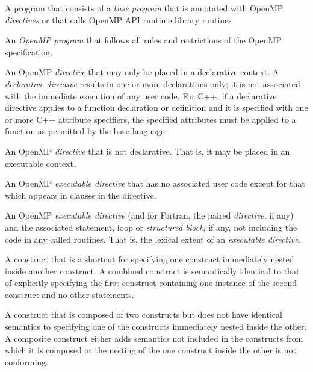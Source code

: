 \glossarydefstart
A program that consists of a \emph{base program} that is annotated with OpenMP
\emph{directives} or that calls OpenMP API runtime library routines
\glossarydefend

\glossarydefstart
An \emph{OpenMP program} that follows all rules and restrictions of the OpenMP
specification.
\glossarydefend

\glossarydefstart
An OpenMP \emph{directive} that may only be placed in a declarative context. A
\emph{declarative directive} results in one or more declarations only; it is 
not associated with the immediate execution of any user code.
For C++, if a declarative directive applies to a function declaration or definition 
and it is specified with one or more C++ attribute specifiers, the specified attributes 
must be applied to a function as permitted by the base language.
\glossarydefend

\glossarydefstart
An OpenMP \emph{directive} that is not declarative. That is, it may be 
placed in an executable context.
\glossarydefend

\glossarydefstart
An OpenMP \emph{executable directive} that has no associated user
code except for that which appears in clauses in the directive.
\glossarydefend


\glossarydefstart
An OpenMP \emph{executable directive} (and for Fortran, the paired 
 \emph{directive}, if any) and the associated statement, 
loop or \emph{structured block}, if any, not including the code in 
any called routines. That is, the lexical extent of an \emph{executable
directive}.
\glossarydefend

\glossarydefstart
A construct that is a shortcut for specifying one construct immediately 
nested inside another construct. A combined construct is semantically 
identical to that of explicitly specifying the first construct containing 
one instance of the second construct and no other statements.
\glossarydefend

\glossarydefstart
A construct that is composed of two constructs but does not have identical 
semantics to specifying one of the constructs immediately nested inside the 
other. A composite construct either adds semantics not included in the 
constructs from which it is composed or the nesting of the one construct 
inside the other is not conforming.
\glossarydefend

